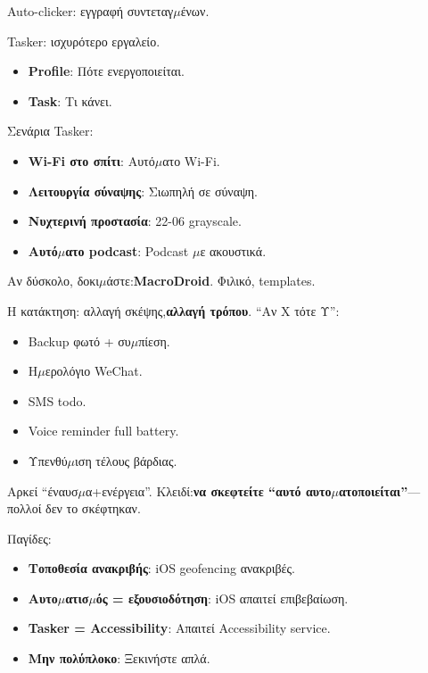 
Auto-clicker: εγγραφή συντεταγ$\mu$ένων.


Tasker: ισχυρότερο εργαλείο.

\begin{itemize}
  \item \textbf{Profile}: Πότε ενεργοποιείται.
  \item \textbf{Task}: Τι κάνει.
\end{itemize}

Σενάρια Tasker:

\begin{itemize}
  \item \textbf{Wi-Fi στο σπίτι}: Αυτό$\mu$ατο Wi-Fi.
  \item \textbf{Λειτουργία σύναψης}: Σιωπηλή σε σύναψη.
  \item \textbf{Νυχτερινή προστασία}: 22-06 grayscale.
  \item \textbf{Αυτό$\mu$ατο podcast}: Podcast $\mu$ε ακουστικά.
\end{itemize}

Αν δύσκολο, δοκι$\mu$άστε:\textbf{MacroDroid}. Φιλικό, templates.


Η κατάκτηση: αλλαγή σκέψης,\textbf{αλλαγή τρόπου}. “Αν Χ τότε Υ”:

\begin{itemize}
  \item Backup φωτό + συ$\mu$πίεση.
  \item Η$\mu$ερολόγιο WeChat.
  \item SMS todo.
  \item Voice reminder full battery.
  \item Υπενθύ$\mu$ιση τέλους βάρδιας.
\end{itemize}

Αρκεί “έναυσ$\mu$α+ενέργεια”. Κλειδί:\textbf{να σκεφτείτε “αυτό αυτο$\mu$ατοποιείται”}— πολλοί δεν το σκέφτηκαν.


Παγίδες:

\begin{itemize}
  \item \textbf{Τοποθεσία ανακριβής}: iOS geofencing ανακριβές.
  \item \textbf{Αυτο$\mu$ατισ$\mu$ός = εξουσιοδότηση}: iOS απαιτεί επιβεβαίωση.
  \item \textbf{Tasker = Accessibility}: Απαιτεί Accessibility service.
  \item \textbf{Μην πολύπλοκο}: Ξεκινήστε απλά.
\end{itemize}

